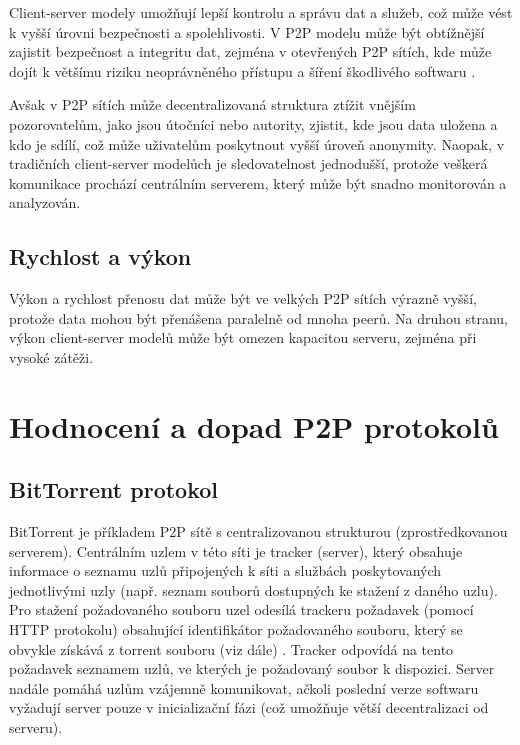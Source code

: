 \documentclass[10pt,twoside,czech,a4paper]{article}
\begin{document}
Client-server modely umožňují lepší kontrolu a správu dat a služeb, což může vést k vyšší úrovni bezpečnosti a spolehlivosti.
V P2P modelu může být obtížnější zajistit bezpečnost a integritu dat, zejména v otevřených P2P sítích, kde může dojít k většímu riziku neoprávněného přístupu a šíření škodlivého softwaru \cite{Leibnitz2007}.

Avšak v P2P sítích může decentralizovaná struktura ztížit vnějším pozorovatelům, jako jsou útočníci nebo autority, zjistit, kde jsou data uložena a kdo je sdílí, což může uživatelům poskytnout vyšší úroveň anonymity.
Naopak, v tradičních client-server modelůch je sledovatelnost jednodušší, protože veškerá komunikace prochází centrálním serverem, který může být snadno monitorován a analyzován.

\subsection{Rychlost a výkon}

Výkon a rychlost přenosu dat může být ve velkých P2P sítích výrazně vyšší, protože data mohou být přenášena paralelně od mnoha peerů.
Na druhou stranu, výkon client-server modelů může být omezen kapacitou serveru, zejména při vysoké zátěži.


\section{Hodnocení a dopad P2P protokolů}

\subsection{BitTorrent protokol}

BitTorrent je příkladem P2P sítě s centralizovanou strukturou (zprostředkovanou serverem).
Centrálním uzlem v této síti je tracker (server), který obsahuje informace o seznamu uzlů připojených k síti a službách poskytovaných jednotlivými uzly (např. seznam souborů dostupných ke stažení z daného uzlu).
Pro stažení požadovaného souboru uzel odesílá trackeru požadavek (pomocí HTTP protokolu) obsahující identifikátor požadovaného souboru, který se obvykle získává z torrent souboru (viz dále) \cite{Chokkalingam2004}.
Tracker odpovídá na tento požadavek seznamem uzlů, ve kterých je požadovaný soubor k dispozici\cite{Radchenko2012}.
Server nadále pomáhá uzlům vzájemně komunikovat, ačkoli poslední verze softwaru vyžadují server pouze v inicializační fázi (což umožňuje větší decentralizaci od serveru)\cite{Lande2008}.
\end{document}
